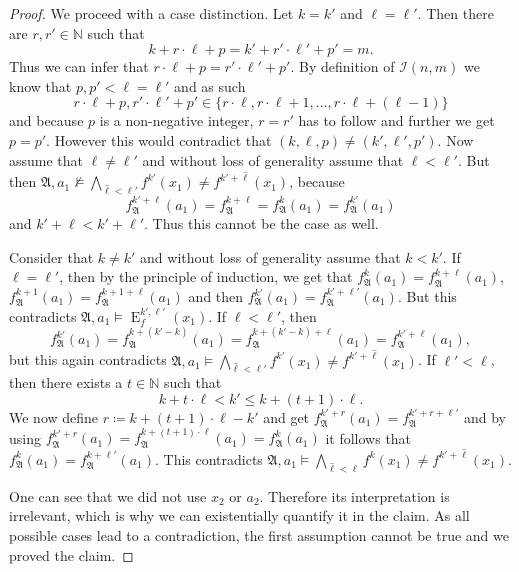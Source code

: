 \begin{proof}
	We proceed with a case distinction. 
	Let $k=k'$ and $\ell=\ell'$.
	Then there are $r,r'\in\mathbb N$ such that
	$$k+r\cdot \ell + p = k'+r'\cdot \ell' + p'=m.$$
	Thus we can infer that $r\cdot \ell+p = r'\cdot \ell'+p'$.
	By definition of $\mathcal{I}(n,m)$ we know that $p,p'<\ell=\ell'$ and as such 
	$$r\cdot \ell +p,r'\cdot \ell'+p'\in \{r\cdot \ell,r\cdot \ell +1,\dots, r\cdot \ell +(\ell-1)\}$$
	and because $p$ is a non-negative integer, $r=r'$ has to follow and further we get $p=p'$.
	However this would contradict that $(k,\ell,p)\neq (k',\ell',p')$.
	Now assume that $\ell\neq\ell'$ and without loss of generality assume that $\ell<\ell'$.
	But then $\mathfrak A,a_1 \not\models \bigwedge_{\hat{\ell}<\ell'}f^{k'}(x_1)\neq f^{k'+\hat{\ell}}(x_1)$, because 
	$$f^{k'+\ell}_{\mathfrak A}(a_1)=f^{k+\ell}_{\mathfrak A}=f^k_{\mathfrak A}(a_1)=f^{k'}_{\mathfrak A}(a_1)$$
	and $k'+\ell < k'+\ell'$.
	Thus this cannot be the case as well.
	
	Consider that $k\neq k'$ and without loss of generality assume that $k<k'$.
	If $\ell=\ell'$, then by the principle of induction, we get that $f_{\mathfrak A}^k(a_1)=f_{\mathfrak A}^{k+\ell}(a_1)$, $f_{\mathfrak A}^{k+1}(a_1)=f_{\mathfrak A}^{k+1+\ell}(a_1)$ and then $f_{\mathfrak A}^{k'}(a_1)=f_{\mathfrak A}^{k'+\ell'}(a_1)$.
	But this contradicts $\mathfrak A,a_1 \models \operatorname{E}^{k',\ell'}_f(x_1)$.
	If $\ell < \ell'$, then 
	$$f_{\mathfrak A}^{k'}(a_1) =f_{\mathfrak A}^{k+(k'-k)}(a_1)=f_{\mathfrak A}^{k+(k'-k)+\ell}(a_1) = f_{\mathfrak A}^{k'+\ell}(a_1),$$
	but this again contradicts $\mathfrak A,a_1 \models \bigwedge_{\hat{\ell}<\ell'}f^{k'}(x_1)\neq f^{k'+\hat{\ell}}(x_1)$.
	If $\ell'<\ell$, then there exists a $t\in\mathbb N$ such that 
	$$k+t\cdot  \ell < k' \leq k+(t+1)\cdot \ell.$$
	We now define $r\coloneqq k+(t+1)\cdot \ell -k'$ and get $f_{\mathfrak A}^{k'+r}(a_1)=f_{\mathfrak A}^{k'+r+\ell'}$ and by using $f_{\mathfrak A}^{k'+r}(a_1)=f_{\mathfrak A}^{k+(t+1)\cdot \ell}(a_1)=f_{\mathfrak A}^k(a_1)$ it follows that $f_{\mathfrak A}^{k}(a_1)=f_{\mathfrak A}^{k+\ell'}(a_1)$.
	This contradicts $\mathfrak A,a_1 \models \bigwedge_{\hat{\ell}<\ell}f^{k}(x_1)\neq f^{k'+\hat{\ell}}(x_1)$.
	
	One can see that we did not use $x_2$ or $a_2$.
	Therefore its interpretation is irrelevant, which is why we can existentially quantify it in the claim.
	As all possible cases lead to a contradiction, the first assumption cannot be true and we proved the claim.
\end{proof}

